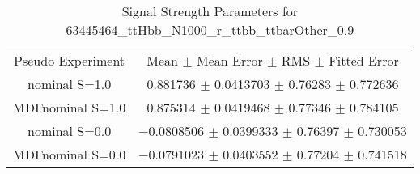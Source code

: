 \begin{table}
\centering
\caption{Signal Strength Parameters for 63445464\_ttHbb\_N1000\_r\_ttbb\_ttbarOther\_0.9}
\begin{tabular}{cc}
\toprule
Pseudo Experiment & Mean $\pm$ Mean Error $\pm$ RMS $\pm$ Fitted Error\\
nominal S=1.0 & \num{0.881736} $\pm$ \num{0.0413703} $\pm$ \num{0.76283} $\pm$ \num{0.772636}\\
MDFnominal S=1.0 & \num{0.875314} $\pm$ \num{0.0419468} $\pm$ \num{0.77346} $\pm$ \num{0.784105}\\
nominal S=0.0 & \num{-0.0808506} $\pm$ \num{0.0399333} $\pm$ \num{0.76397} $\pm$ \num{0.730053}\\
MDFnominal S=0.0 & \num{-0.0791023} $\pm$ \num{0.0403552} $\pm$ \num{0.77204} $\pm$ \num{0.741518}\\
\bottomrule
\end{tabular}
\end{table}
